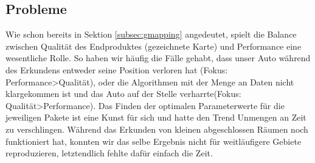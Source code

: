 \subsection{Probleme}
\label{subsec:probleme}
Wie schon bereits in Sektion \ref{subsec:gmapping} angedeutet, spielt die Balance zwischen Qualität des Endproduktes (gezeichnete Karte) und Performance eine wesentliche Rolle. So haben wir häufig die Fälle gehabt, dass unser Auto während des Erkundens entweder seine Position verloren hat (Fokus: Performance>Qualität), oder die Algorithmen mit der Menge an Daten nicht klargekommen ist und das Auto auf der Stelle verharrte(Fokus: Qualität>Performance). Das Finden der optimalen Parameterwerte für die jeweiligen Pakete ist eine Kunst für sich und hatte den Trend Unmengen an Zeit zu verschlingen. Während das Erkunden von kleinen abgeschlossen Räumen noch funktioniert hat, konnten wir das selbe Ergebnis nicht für weitläufigere Gebiete reproduzieren, letztendlich fehlte dafür einfach die Zeit.